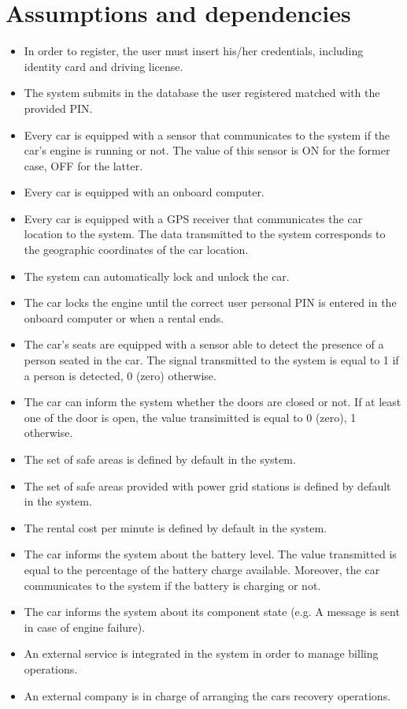 \section{Assumptions and dependencies}

\begin{itemize}
	\item In order to register, the user must insert his/her credentials, including identity card and driving license.
	\item The system submits in the database the user registered matched with the provided PIN.
	\item Every car is equipped with a sensor that communicates to the system if the car's engine is running or not. The value of this sensor is ON for the former case, OFF for the latter.
	\item Every car is equipped with an onboard computer.
	\item Every car is equipped with a GPS receiver that communicates the car location to the system. The data transmitted to the system corresponds to the geographic coordinates of the car location.
	\item The system can automatically lock and unlock the car.
	\item The car locks the engine until the correct user personal PIN is entered in the onboard computer or when a rental ends.
	\item The car's seats are equipped with a sensor able to detect the presence of a person seated in the car. The signal transmitted to the system is equal to 1 if a person is detected, 0 (zero) otherwise.
	\item The car can inform the system whether the doors are closed or not. If at least one of the door is open, the value transimitted is equal to 0 (zero), 1 otherwise.
	\item The set of safe areas is defined by default in the system.
	\item The set of safe areas provided with power grid stations is defined by default in the system.
	\item The rental cost per minute is defined by default in the system.
	\item The car informs the system about the battery level. The value transmitted is equal to the percentage of the battery charge available. Moreover, the car communicates to the system if the battery is charging or not.
	\item The car informs the system about its component state (e.g. A message is sent in case of engine failure).
	\item An external service is integrated in the system in order to manage billing operations.
	\item An external company is in charge of arranging the cars recovery operations.
\end{itemize}
